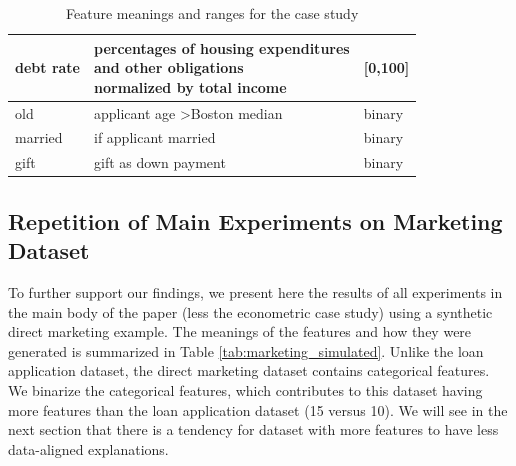 \documentclass[mnsc,blindrev]{informs3}
\begin{document}
\begin{table}[ht!]
\begin{tabular}{|l|l|l|}
            debt rate           & \makecell{percentages of housing expenditures \\ and other obligations \\ normalized by total income}    & {[}0,100{]}                   \\ \hline
            old              & applicant age \textgreater Boston median & binary                        \\ \hline
            married          & if applicant married               & binary                        \\ \hline
            gift             & gift as down payment               & binary                         \\
            \hline
            \end{tabular}
            \caption{Feature meanings and ranges for the case study}
            \label{tab:case_study_features}
        \end{table}


  

    
    
    \subsection{Repetition of Main Experiments on Marketing Dataset}
        \label{apx_sec:marketing}
        To further support our findings, we present here the results of all experiments in the main body of the paper (less the econometric case study) using a synthetic direct marketing example. The meanings of the features and how they were generated is summarized in Table \ref{tab:marketing_simulated}. Unlike the loan application dataset, the direct marketing dataset contains categorical features. We binarize the categorical features, which contributes to this dataset having more features than the loan application dataset (15 versus 10). We will see in the next section that there is a tendency for dataset with more features to have less data-aligned explanations.
\end{document}
